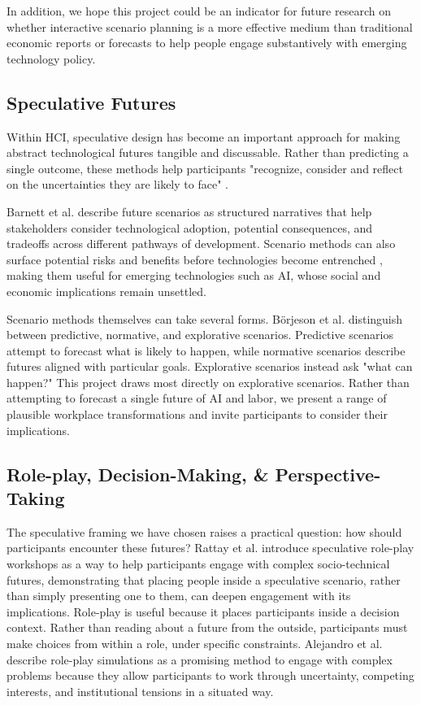 \documentclass[sigconf,authordraft]{acmart}
\begin{document}
In addition, we hope this project could be an indicator for future research on whether interactive scenario planning is a more effective medium than traditional economic reports or forecasts to help people engage substantively with emerging technology policy.

\subsection{Speculative Futures}

Within HCI, speculative design has become an important approach for making abstract technological futures tangible and discussable. Rather than predicting a single outcome, these methods help participants "recognize, consider and reflect on the uncertainties they are likely to face" \cite{varum2010scenarios}.

Barnett et al. \cite{barnett2025scenarios} describe future scenarios as structured narratives that help stakeholders consider technological adoption, potential consequences, and tradeoffs across different pathways of development. Scenario methods can also surface potential risks and benefits before technologies become entrenched \cite{brey2017ethics}, making them useful for emerging technologies such as AI, whose social and economic implications remain unsettled.

Scenario methods themselves can take several forms. Börjeson et al. \cite{borjeson2006scenario} distinguish between predictive, normative, and explorative scenarios. Predictive scenarios attempt to forecast what is likely to happen, while normative scenarios describe futures aligned with particular goals. Explorative scenarios instead ask "what can happen?" This project draws most directly on explorative scenarios. Rather than attempting to forecast a single future of AI and labor, we present a range of plausible workplace transformations and invite participants to consider their implications.


\subsection{Role-play, Decision-Making, \& Perspective-Taking}


The speculative framing we have chosen raises a practical question: how should participants encounter these futures? Rattay et al. \cite{rattay2023sensing} introduce speculative role-play workshops as a way to help participants engage with complex socio-technical futures, demonstrating that placing people inside a speculative scenario, rather than simply presenting one to them, can deepen engagement with its implications. Role-play is useful because it places participants inside a decision context. Rather than reading about a future from the outside, participants must make choices from within a role, under specific constraints. Alejandro et al. \cite{alejandro2024roleplay} describe role-play simulations as a promising method to engage with complex problems because they allow participants to work through uncertainty, competing interests, and institutional tensions in a situated way.
\end{document}

